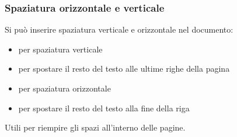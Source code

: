 \begin{frame}[fragile]
  \frametitle{Spaziatura orizzontale e verticale}
  
  Si può inserire spaziatura verticale e orizzontale nel documento:
  \begin{itemize}
   \item \texttt{\vspace{#em}} per spaziatura 
verticale
    \item \inline{\vfill} per spostare il resto del testo alle ultime righe della pagina
   \item \texttt{\hspace{#em}} per spaziatura 
orizzontale
    \item \inline{\hfill} per spostare il resto del testo alla fine della riga
  \end{itemize}
  \vspace{5mm}
  Utili per riempire gli spazi all'interno delle pagine.
  
  
 

\end{frame}
